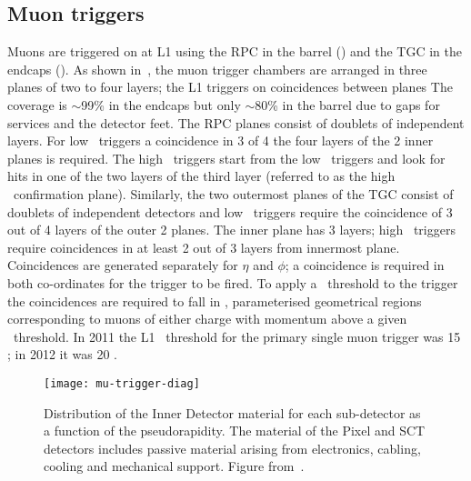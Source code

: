 \subsection{Muon triggers}
\label{sec:reco-mu-triggers}

Muons are triggered on at L1 using the RPC in the barrel () and
the TGC in the endcaps (). As shown in~, the
muon trigger chambers are arranged in three planes of two to four layers; the L1
triggers on coincidences between planes
The coverage is $\sim$99\% in the endcaps but only $\sim$80\% in the barrel due to
gaps for services and the detector feet.
The RPC planes consist of
doublets of independent layers. For low \pt\ triggers a coincidence in 3 of 4
the four layers of the 2 inner planes is required. The high \pt\ triggers start
from the low \pt\ triggers and look for hits in one of the two layers of the
third layer (referred to as the high \pt\ confirmation plane). Similarly, the two outermost
planes of the TGC consist of doublets of independent detectors and low \pt\
triggers require the coincidence of 3 out of 4 layers of the outer 2 planes. The
inner plane has 3 layers; high \pt\ triggers require coincidences in at least 2
out of 3 layers from innermost plane. Coincidences are generated separately for
$\eta$ and $\phi$; a coincidence is required in both co-ordinates for the
trigger to be fired. To apply a \pt\ threshold to the trigger the coincidences
are required to fall in \intro{roads}, parameterised geometrical regions
corresponding to muons of either charge with momentum above a given \pt\
threshold. In 2011 the L1 \pt\ threshold for the primary single muon trigger was
15 \GeV; in 2012 it was 20 \GeV.

\begin{figure}[h]
\centering
            \texttt{[image: mu-trigger-diag]}
\caption{
Distribution of the Inner Detector material for each sub-detector as a
function of the pseudorapidity. The material of the Pixel and SCT detectors
includes passive material arising from electronics, cabling, cooling and
mechanical support. Figure from~\cite{TriggerPerf2010}.}
\label{fig:mu-trigger-diag}
\end{figure}

